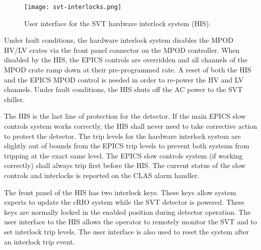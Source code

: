 \begin{figure}[hbt] 
\centering 
\texttt{[image: svt-interlocks.png]}
\caption{User interface for the SVT hardware interlock system (HIS).}
\label{fig:svt-interlocks}
\end{figure}

Under fault conditions, the hardware interlock system disables the MPOD HV/LV crates via the front panel connector on the MPOD controller. When disabled by the HIS, the EPICS controls are overridden and all channels of the MPOD crate ramp down at their pre-programmed rate. A reset of both the HIS and the EPICS MPOD control is needed in order to re-power the HV and LV channels. Under fault conditions, the HIS shuts off the AC power to the SVT chiller. 


The HIS is the last line of protection for the detector. If the main EPICS slow controls system works correctly, the HIS shall never need to take corrective action to protect the detector. The trip levels for the hardware interlock system are slightly out of bounds from the EPICS trip levels to prevent both systems from tripping at the exact same level. The EPICS slow controls system (if working correctly) shall always trip first before the HIS. The current status of the slow controls and interlocks is reported on the CLAS alarm handler. %

The front panel of the HIS has two interlock keys. These keys allow system experts to update the cRIO system while the SVT detector is powered. These keys are normally locked in the enabled position during detector operation.
The user interface to the HIS allows the operator to remotely monitor the SVT and to set interlock trip levels. The user interface is also used to reset the system after an interlock trip event. 



